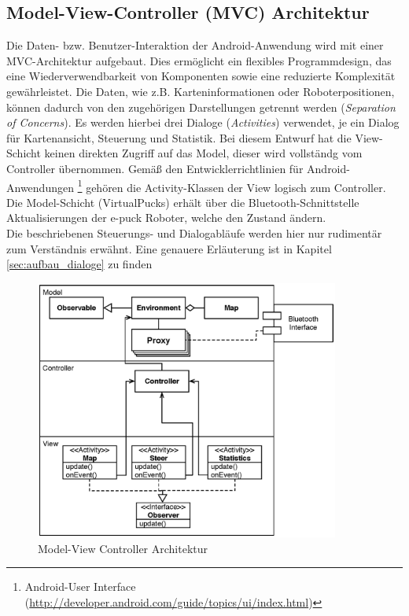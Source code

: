 \documentclass[10pt,a4paper]{article}
\begin{document}
			\subsection{Model-View-Controller (MVC) Architektur}
				Die Daten- bzw. Benutzer-Interaktion der Android-Anwendung wird mit einer MVC-Architektur aufgebaut. Dies ermöglicht ein
				flexibles Programmdesign, das eine Wiederverwendbarkeit von Komponenten sowie eine reduzierte Komplexität gewährleistet.
				Die Daten, wie z.B. Karteninformationen oder Roboterpositionen, können dadurch von den zugehörigen Darstellungen getrennt werden
				(\textit{Separation of Concerns}). Es werden hierbei drei Dialoge (\textit{Activities}) verwendet, je ein Dialog für Kartenansicht, Steuerung und
				Statistik. Bei diesem Entwurf hat die View-Schicht keinen direkten Zugriff auf das Model, dieser wird vollständg vom
				Controller übernommen. Gemäß den Entwicklerrichtlinien für Android-Anwendungen 
				\footnote{Android-User Interface (\url{http://developer.android.com/guide/topics/ui/index.html})} gehören die Activity-Klassen der
				View logisch zum	Controller. Die Model-Schicht (VirtualPucks) erhält über die Bluetooth-Schnittstelle Aktualisierungen der e-puck Roboter,
				welche den Zustand ändern.\\
				Die beschriebenen Steuerungs- und Dialogabläufe werden hier nur rudimentär zum Verständnis erwähnt. Eine genauere Erläuterung ist in
				Kapitel \ref{sec:aufbau_dialoge} zu finden
	  			\begin{figure}
					\centering
					\includegraphics[width=10cm]{images/android_mvc.eps}
  					\caption{Model-View Controller Architektur}
  					\label{fig:mvc}
 	 			\end{figure}					
\end{document}
